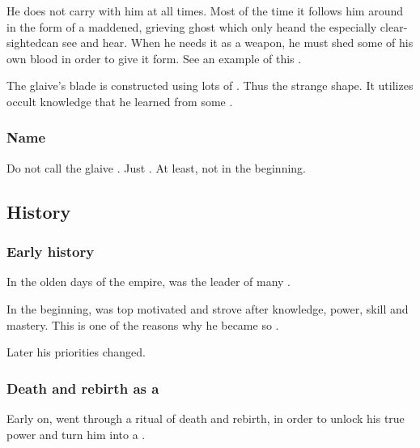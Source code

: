 He does not carry \Triestessakhin{} with him at all times. 
Most of the time it follows him around in the form of a maddened, grieving ghost which only he\dash and the especially clear-sighted\dash can see and hear. 
When he needs it as a weapon, he must shed some of his own blood in order to give it form. 
See an example of this .

The glaive's blade is constructed using lots of . 
Thus the strange shape. 
It utilizes occult knowledge that he learned from some . 





\subsubsection{Name}
Do not call the glaive \quo{\Rystessakhin}. 
Just .
At least, not in the beginning. 









\subsection{History}





\subsubsection{Early history}
In the olden days of the \draconian{} empire, \Nexagglachel was the leader of many \dragons. 

In the beginning, \Ishnaruchaefir{} was top motivated and strove after knowledge, power, skill and mastery. 
This is one of the reasons why he became so . 

Later his priorities changed. 







\subsubsection{Death and rebirth as a \shaeeroth}
Early on, \Ishna{} went through a ritual of death and rebirth, in order to unlock his true power and turn him into a .

